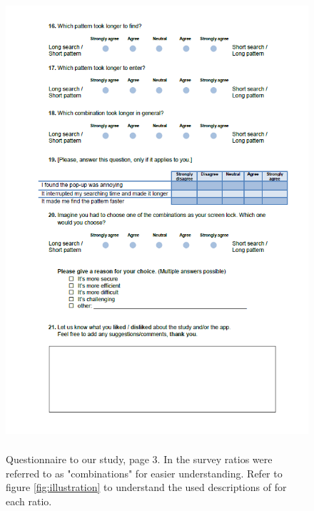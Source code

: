 \begin{figure}[H]
\includegraphics[width=13cm, height=17cm]{Chapters/graphics/survey3.PNG}
\caption{Questionnaire to our study, page 3. In the survey ratios were referred to as "combinations" for easier understanding. Refer to figure \ref{fig:illustration} to understand the used descriptions of for each ratio.}
\label{fig:survey3}
\end{figure}

